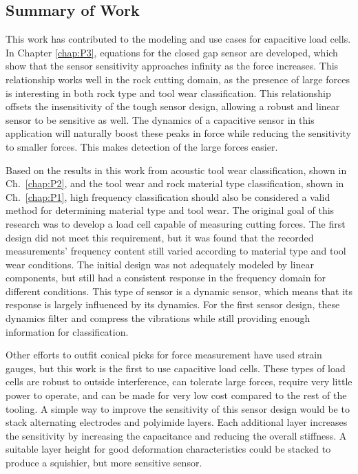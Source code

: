 \subsection{Summary of Work}

This work has contributed to the modeling and use cases for capacitive load cells. 
In Chapter \ref{chap:P3}, equations for the
closed gap sensor are developed, which show that the sensor sensitivity approaches infinity as the force increases.
This relationship works well in the rock cutting domain, as the presence of large forces is interesting
in both rock type and tool wear classification. 
This relationship offsets the insensitivity of the tough sensor design, 
allowing a robust and linear sensor to be sensitive as well.
The dynamics of a capacitive sensor in this application will 
naturally boost these peaks in force while reducing the sensitivity to smaller forces. This makes
detection of the large forces easier.

Based on the results in this work from acoustic tool wear classification, shown in Ch.~\ref{chap:P2}, 
and the tool wear and rock material type classification, shown in Ch.~\ref{chap:P1}, high frequency classification 
should also be considered a valid method for determining material type and tool wear. 
The original goal of this research was to develop a load cell capable of measuring cutting forces.
The first design did not meet this requirement, but it was found that the recorded measurements'
frequency content still varied according to material type and tool wear conditions.
The initial design was not adequately modeled by linear components, but still 
had a consistent response in the frequency domain for different conditions.
This type of sensor is a dynamic sensor, which means that its response
is largely influenced by its dynamics. For the first sensor design,
these dynamics filter and compress the vibrations while still providing enough information for classification.

Other efforts to outfit conical picks for force measurement have used strain gauges, but this work is the first to use
capacitive load cells. These types of load cells are robust to outside interference, can tolerate large forces,
require very little power to operate, and can be made for very low cost compared to the rest of the tooling.
A simple way to improve the sensitivity of this sensor design would be to stack alternating electrodes and polyimide layers.
Each additional layer increases the sensitivity by increasing the capacitance and reducing the overall stiffness.
A suitable layer height for good deformation characteristics could be stacked to produce a squishier, but more sensitive sensor.

